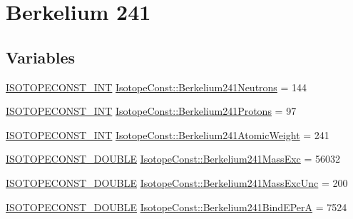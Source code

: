\hypertarget{group___isotope_const-_berkelium-_bk241}{}\section{Berkelium 241}
\label{group___isotope_const-_berkelium-_bk241}
\subsection*{Variables}
\begin{DoxyCompactItemize}
\item 
\mbox{\hyperlink{group___isotope_const-_macros_ga5f18360b3e99483a35c32d789e62621c}{I\+S\+O\+T\+O\+P\+E\+C\+O\+N\+S\+T\+\_\+\+I\+NT}} \mbox{\hyperlink{group___isotope_const-_berkelium-_bk241_ga1b3771bc37d42e0f12173000f1f1d01e}{Isotope\+Const\+::\+Berkelium241\+Neutrons}} = 144
\item 
\mbox{\hyperlink{group___isotope_const-_macros_ga5f18360b3e99483a35c32d789e62621c}{I\+S\+O\+T\+O\+P\+E\+C\+O\+N\+S\+T\+\_\+\+I\+NT}} \mbox{\hyperlink{group___isotope_const-_berkelium-_bk241_ga4ef1e8d167494a85236ab2a1f46ca016}{Isotope\+Const\+::\+Berkelium241\+Protons}} = 97
\item 
\mbox{\hyperlink{group___isotope_const-_macros_ga5f18360b3e99483a35c32d789e62621c}{I\+S\+O\+T\+O\+P\+E\+C\+O\+N\+S\+T\+\_\+\+I\+NT}} \mbox{\hyperlink{group___isotope_const-_berkelium-_bk241_ga362b052df40ded068f75fc58f553fa58}{Isotope\+Const\+::\+Berkelium241\+Atomic\+Weight}} = 241
\item 
\mbox{\hyperlink{group___isotope_const-_macros_ga8f45a7272ce02c0b4c65c44636ed719a}{I\+S\+O\+T\+O\+P\+E\+C\+O\+N\+S\+T\+\_\+\+D\+O\+U\+B\+LE}} \mbox{\hyperlink{group___isotope_const-_berkelium-_bk241_ga6a5af31bff542c02ec1537115c52093e}{Isotope\+Const\+::\+Berkelium241\+Mass\+Exc}} = 56032
\item 
\mbox{\hyperlink{group___isotope_const-_macros_ga8f45a7272ce02c0b4c65c44636ed719a}{I\+S\+O\+T\+O\+P\+E\+C\+O\+N\+S\+T\+\_\+\+D\+O\+U\+B\+LE}} \mbox{\hyperlink{group___isotope_const-_berkelium-_bk241_ga5bc571cba4089e70448153514c618418}{Isotope\+Const\+::\+Berkelium241\+Mass\+Exc\+Unc}} = 200
\item 
\mbox{\hyperlink{group___isotope_const-_macros_ga8f45a7272ce02c0b4c65c44636ed719a}{I\+S\+O\+T\+O\+P\+E\+C\+O\+N\+S\+T\+\_\+\+D\+O\+U\+B\+LE}} \mbox{\hyperlink{group___isotope_const-_berkelium-_bk241_ga6ea92138cbf67f4e9edca429cc158c86}{Isotope\+Const\+::\+Berkelium241\+Bind\+E\+PerA}} = 7524
\item 

\end{DoxyCompactItemize}
